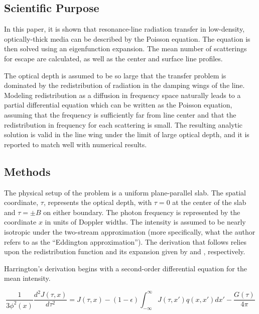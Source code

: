 \documentclass[onecolumn]{aastex63}
\begin{document}
\subsection{Scientific Purpose}
In this paper, it is shown that resonance-line radiation transfer in low-density, optically-thick media can be described by the Poisson equation. The equation is then solved using an eigenfunction expansion. The mean number of scatterings for escape are calculated, as well as the center and surface line profiles.

The optical depth is assumed to be so large that the transfer problem is dominated by the redistribution of radiation in the damping wings of the line. Modeling redistribution as a diffusion in frequency space naturally leads to a partial differential equation which can be written as the Poisson equation, assuming that the frequency is sufficiently far from line center and that the redistribution in frequency for each scattering is small. The resulting analytic solution is valid in the line wing under the limit of large optical depth, and it is reported to match well with numerical results.

\subsection{Methods}
The physical setup of the problem is a uniform plane-parallel slab. The spatial coordinate, $\tau$, represents the optical depth, with $\tau=0$ at the center of the slab and $\tau=\pm B$ on either boundary. The photon frequency is represented by the coordinate $x$ in units of Doppler widths. The intensity is assumed to be nearly isotropic under the two-stream approximation (more specifically, what the author refers to as the ``Eddington approximation''). The derivation that follows relies upon the redistribution function and its expansion given by \cite{hummer1962} and \cite{1972ApJ...174..439A}, respectively. 


Harrington's derivation begins with a second-order differential equation for the mean intensity.

\begin{equation} \label{harrington1}
    \frac{1}{3\phi^2(x)}\frac{d^2J(\tau, x)}{d\tau^2} = J(\tau, x) - (1-\epsilon)\int_{-\infty}^{\infty}J(\tau, x')q(x, x')dx' - \frac{G(\tau)}{4\pi}
\end{equation}
\end{document}
